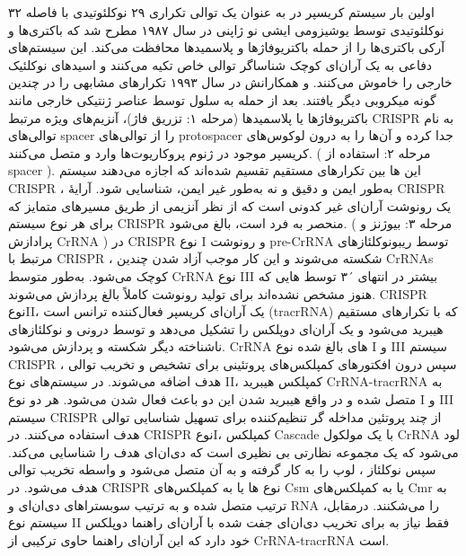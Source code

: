 \documentclass[12pt,a4paper,BCOR=.7cm,headsepline,bibliography=totoc]{report}
\begin{document}
اولین بار سیستم کریسپر در
 به عنوان یک توالی تکراری ۲۹ نوکلئوتیدی با فاصله ۳۲ نوکلئوتیدی توسط یوشیزومی ایشی نو ژاپنی در سال ۱۹۸۷ مطرح شد که باکتری‌ها و آرکی باکتری‌ها را از حمله باکتریوفاژها و پلاسمیدها محافظت می‌کند. این سیستم‌های دفاعی به یک آر‌ان‌ای کوچک شناساگر توالی خاص تکیه می‌کنند و اسیدهای نوکلئیک خارجی را خاموش می‌کنند.
\cite{Ishino} 
 و همکارانش در سال ۱۹۹۳ تکرارهای مشابهی را در چندین گونه میکروبی دیگر یافتند.\cite{Mojica}
بعد از حمله به سلول توسط عناصر ژنتیکی خارجی مانند باکتریوفاژها یا پلاسمیدها (مرحله ۱: تزریق فاژ)، آنزیم‌های ویژه مرتبط CRISPR
 به نام
 توالی‌های spacer را از توالی‌های protospacer جدا کرده و آن‌ها را به درون لوکوس‌های کریسپر موجود در ژنوم پروکاریوت‌ها وارد و متصل می‌کنند. ( مرحله ۲: استفاده از spacer ). این 
ها
 بین تکرارهای مستقیم تقسیم شده‌اند که اجازه می‌دهند سیستم CRISPR ، به‌طور ایمن و دقیق و نه به‌طور غیر ایمن، شناسایی شود. آرایهٔ CRISPR یک رونوشت آر‌ان‌ای غیر کدونی است که از نظر آنزیمی از طریق مسیرهای متمایز که برای هر نوع سیستم CRISPR منحصر به فرد است، بالغ می‌شود. ( مرحله ۳: بیوژنز و پرادازش CrRNA ) در CRISPR نوع I و
رونوشت pre-CrRNA توسط ریبونوکلئازهای مرتبط با CRISPR ، شکسته می‌شوند و این کار موجب آزاد شدن چندین CrRNAs کوچک می‌شود. به‌طور متوسط CrRNA نوع III بیشتر در انتهای ´۳ توسط
 هایی 
که هنوز مشخص نشده‌اند برای تولید رونوشت کاملاً بالغ پردازش می‌شوند. CRISPR نوعII، یک آر‌ان‌ای کریسپر فعال‌کننده ترانس است (tracrRNA) که با تکرارهای مستقیم هیبرید می‌شود و یک آر‌ان‌ای دوپلکس را تشکیل می‌دهد و توسط 
 درونی و نوکلئازهای ناشناخته دیگر شکسته و پردازش می‌شود. CrRNA های بالغ شده نوع I و III سیستم CRISPR ، سپس درون افکتورهای کمپلکس‌های پروتئینی برای تشخیص و تخریب توالی هدف اضافه می‌شوند. در سیستم‌های نوع II، کمپلکس هیبرید CrRNA-tracrRNA به  متصل شده و در واقع هیبرید شدن این دو باعث فعال شدن  می‌شود. هر دو نوع I و III سیستم CRISPR از چند پروتئین مداخله گر تنظیم‌کننده برای تسهیل شناسایی توالی هدف استفاده می‌کنند. در CRISPR نوعI، کمپلکس Cascade با یک مولکول CrRNA لود می‌شود که یک مجموعه نظارتی بی نظیری است که دی‌ان‌ای هدف را شناسایی می‌کند. سپس نوکلئاز ، لوپ  را به کار گرفته و به آن متصل می‌شود و واسطه تخریب توالی هدف می‌شود. در CRISPR نوع ها یا به کمپلکس‌های Csm یا به کمپلکس‌های Cmr به ترتیب متصل شده و به ترتیب سوبستراهای دی‌ان‌ای و RNA را می‌شکنند. درمقابل، سیستم نوع II فقط نیاز به  برای تخریب دی‌ان‌ای جفت شده با آر‌ان‌ای راهنما دوپلکس خود دارد که این آر‌ان‌ای راهنما حاوی ترکیبی از CrRNA-tracrRNA است.
\end{document}
